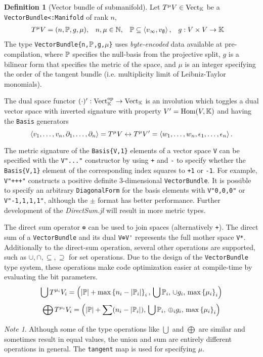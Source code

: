 \documentclass[]{article}
\theoremstyle{definition}
\newtheorem{definition}{Definition}
\theoremstyle{remark}
\newtheorem*{note}{Note}
\begin{document}
\begin{definition}[Vector bundle of submanifold]
	Let $T^\mu V\in\text{Vect}_{\mathbb{K}}$ be a \verb`VectorBundle<:Manifold` of rank $n$,
	\begin{align*}
		T^\mu V &= (n,\mathbb{P},g,\mu), & n,\mu &\in\mathbb{N}, & \mathbb{P} &\subseteq\left\langle v_\infty,v_\emptyset \right\rangle, & g &:V\times V\rightarrow\mathbb{K}
	\end{align*}
	The type \verb+VectorBundle{n,+$\mathbb{P}$\verb+,g,+$\mu$\verb+}+ uses \textit{byte-encoded} data available at pre-compilation, where
	$\mathbb{P}$ specifies the null-basis from the projective split,
	$g$ is a bilinear form that specifies the metric of the space,
	and $\mu$ is an integer specifying the order of the tangent bundle (i.e. multiplicity limit of Leibniz-Taylor monomials).

	The dual space functor $(\cdot)':\text{Vect}_{\mathbb{K}}^\text{op}\rightarrow\text{Vect}_{\mathbb{K}}$ 
	is an involution which toggles a dual vector space with inverted signature with property $V' = \text{Hom}(V,\mathbb{K})$ and having the \verb`Basis` generators
	$$\left\langle v_1,\dots,v_n,\partial_1,\dots,\partial_n \right\rangle=T^\mu V\leftrightarrow T^\mu V' = \left\langle w_1,\dots,w_n,\epsilon_1,\dots,\epsilon_n \right\rangle.$$

	The metric signature of the \verb+Basis{V,1}+ elements of a vector space \verb+V+ can be specified with the \verb+V"..."+ constructor by using \verb-+- and \verb+-+ to specify whether the \verb+Basis{V,1}+ element of the corresponding index squares to \verb`+1` or \verb`-1`.
	For example, \verb`V"+++"` constructs a positive definite 3-dimensional \verb`VectorBundle`.
	It is possible to specify an arbitrary \verb`DiagonalForm` for the basis elements with \verb`V"0,0,0"` or \verb`V"-1,1,1,1"`, although the $\pm$ format has better performance.
	Further development of the \textit{DirectSum.jl} will result in more metric types.

	The direct sum operator \verb`⊕` can be used to join spaces (alternatively \verb`+`).
	The direct sum of a \verb`VectorBundle` and its dual \verb`V⊕V'` represents the full mother space \verb`V*`.
	Additionally to the direct-sum operation, several other operations are supported, such as $\cup,\cap,\subseteq,\supseteq$ for set operations.
	Due to the design of the \verb`VectorBundle` type system, these operations make code optimization easier at compile-time by evaluating the bit parameters.
	$$ \bigcup T^{\mu_i}V_i = \left(|\mathbb{P}|+\max\left\{ n_i-|\mathbb{P}_i| \right\}_i,\, \bigcup \mathbb{P}_i,\, \cup g_i,\, \max\left\{ \mu_i \right\}_i\right) $$
	$$ \bigoplus T^{\mu_i}V_i = \left(\left|\mathbb{P}\right|+\sum (n_i-|\mathbb{P}_i|),\, \bigcup \mathbb{P}_i,\, \oplus_i g_i,\,\max\left\{ \mu_i \right\}_i\right) $$
\end{definition}
\begin{note}
	Although some of the type operations like $\bigcup$ and $\bigoplus$ are similar and sometimes result in equal values, the union and sum are entirely different operations in general. The \verb`tangent` map is used for specifying $\mu$.
\end{note}
\end{document}
